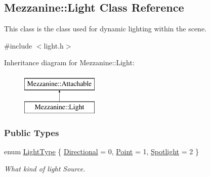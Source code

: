 \hypertarget{classMezzanine_1_1Light}{
\subsection{Mezzanine::Light Class Reference}
\label{classMezzanine_1_1Light}
}


This class is the class used for dynamic lighting within the scene.  




{\ttfamily \#include $<$light.h$>$}

Inheritance diagram for Mezzanine::Light:\begin{figure}[H]
\begin{center}
\leavevmode
\includegraphics[height=2.000000cm]{classMezzanine_1_1Light}
\end{center}
\end{figure}
\subsubsection*{Public Types}
\begin{DoxyCompactItemize}
\item 
enum \hyperlink{classMezzanine_1_1Light_a783df27d8261c5af2226bc75586944be}{LightType} \{ \hyperlink{classMezzanine_1_1Light_a783df27d8261c5af2226bc75586944bea0374f1b4eee3903c6857838f0de8c48e}{Directional} =  0, 
\hyperlink{classMezzanine_1_1Light_a783df27d8261c5af2226bc75586944bea8922c0c85b8c971b99e636ff924bfb5d}{Point} =  1, 
\hyperlink{classMezzanine_1_1Light_a783df27d8261c5af2226bc75586944beab3af9a02884457e13f67d4bba11e4b4c}{Spotlight} =  2
 \}
\begin{DoxyCompactList}\small\item\em What kind of light Source. \item\end{DoxyCompactList}\end{DoxyCompactItemize}

